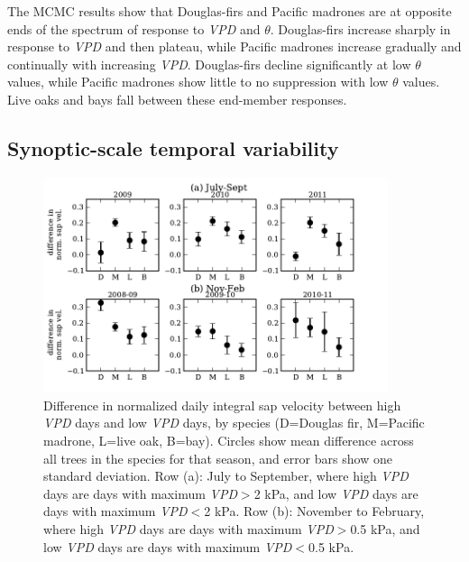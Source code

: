 The MCMC results show that Douglas-firs and Pacific madrones are at opposite ends of the spectrum of response to \textit{VPD} and $\theta$.  Douglas-firs increase sharply in response to \textit{VPD} and then plateau, while Pacific madrones increase gradually and continually with increasing \textit{VPD}.  Douglas-firs decline significantly at low $\theta$ values, while Pacific madrones show little to no suppression with low $\theta$ values.  Live oaks and bays fall between these end-member responses.

\subsection{Synoptic-scale temporal variability}

\begin{figure}[here]
\includegraphics[width=0.9\textwidth]{ch1-sapflow/figures/Figure08.pdf}
\caption{Difference in normalized daily integral sap velocity between high \textit{VPD} days and low \textit{VPD} days, by species (D=Douglas fir, M=Pacific madrone, L=live oak, B=bay).  Circles show mean difference across all trees in the species for that season, and error bars show one standard deviation.  Row (a): July to September, where high \textit{VPD} days are days with maximum \textit{VPD}$>$2 kPa, and low \textit{VPD} days are days with maximum \textit{VPD}$<$2 kPa.  Row (b): November to February, where high \textit{VPD} days are days with maximum \textit{VPD}$>$0.5 kPa, and low \textit{VPD} days are days with maximum \textit{VPD}$<$0.5 kPa.}
\label{fig:sapflow_synoptic}
\end{figure}

